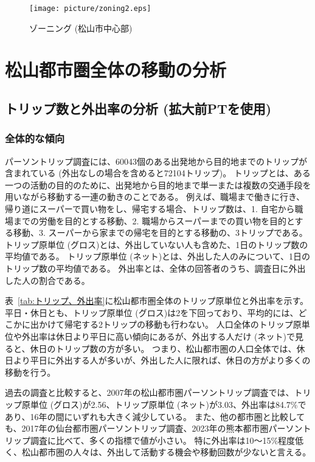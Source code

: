 \documentclass[a4paper,12pt, uplatex]{jsbook}
\begin{document}
\begin{figure}[htbp]
    \centering
    \texttt{[image: picture/zoning2.eps]}
    \caption{ゾーニング (松山市中心部)}
    \label{fig:zoning2}
\end{figure}


\chapter{松山都市圏全体の移動の分析}

\section{トリップ数と外出率の分析 (拡大前PTを使用)}
\subsection{全体的な傾向}
パーソントリップ調査には、60043個のある出発地から目的地までのトリップが含まれている (外出なしの場合を含めると72104トリップ)。
トリップとは、ある一つの活動の目的のために、出発地から目的地まで単一または複数の交通手段を用いながら移動する一連の動きのことである。
例えば、職場まで働きに行き、帰り道にスーパーで買い物をし、帰宅する場合、トリップ数は、1. 自宅から職場までの労働を目的とする移動、2. 職場からスーパーまでの買い物を目的とする移動、3. スーパーから家までの帰宅を目的とする移動の、3トリップである。
トリップ原単位 (グロス)とは、外出していない人も含めた、1日のトリップ数の平均値である。
トリップ原単位 (ネット)とは、外出した人のみについて、1日のトリップ数の平均値である。
外出率とは、全体の回答者のうち、調査日に外出した人の割合である。

表~\ref{tab:トリップ、外出率}に松山都市圏全体のトリップ原単位と外出率を示す。
平日・休日とも、トリップ原単位 (グロス)は2を下回っており、平均的には、どこかに出かけて帰宅する2トリップの移動も行わない。
人口全体のトリップ原単位や外出率は休日より平日に高い傾向にあるが、外出する人だけ (ネット)で見ると、休日のトリップ数の方が多い。
つまり、松山都市圏の人口全体では、休日より平日に外出する人が多いが、外出した人に限れば、休日の方がより多くの移動を行う。

過去の調査と比較すると、2007年の松山都市圏パーソントリップ調査では、トリップ原単位 (グロス)が2.56、トリップ原単位 (ネット)が3.03、外出率は84.7\%\cite{松山市総合交通戦略}であり、16年の間にいずれも大きく減少している。
また、他の都市圏と比較しても、2017年の仙台都市圏パーソントリップ調査\cite{ibs_report}、2023年の熊本都市圏パーソントリップ調査\cite{kumamoto}に比べて、多くの指標で値が小さい。
特に外出率は10〜15\%程度低く、松山都市圏の人々は、外出して活動する機会や移動回数が少ないと言える。
\end{document}
